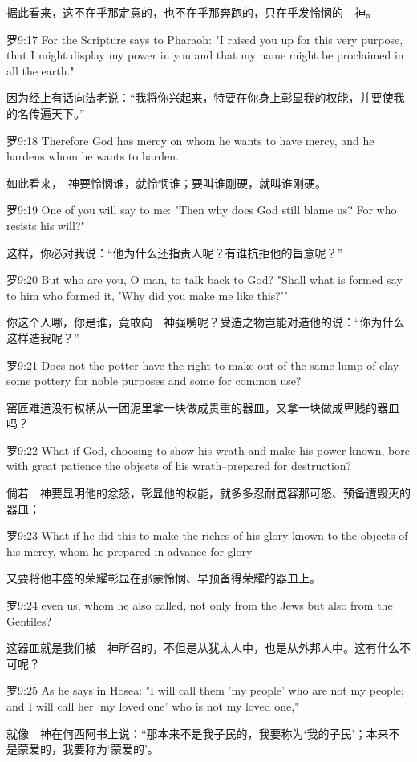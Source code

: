 \documentclass[a4paper,11pt,onecolumn,twoside]{ctexart}
\begin{document}
\begin{multicols}{2}
 据此看来，这不在乎那定意的，也不在乎那奔跑的，只在乎发怜悯的　神。


 罗9:17
 For the Scripture says to Pharaoh: "I raised you up for this very purpose, that I might display my power in you and that my name might be proclaimed in all the earth."

 因为经上有话向法老说：“我将你兴起来，特要在你身上彰显我的权能，并要使我的名传遍天下。”


 罗9:18
 Therefore God has mercy on whom he wants to have mercy, and he hardens whom he wants to harden.

 如此看来，　神要怜悯谁，就怜悯谁；要叫谁刚硬，就叫谁刚硬。


 罗9:19
 One of you will say to me: "Then why does God still blame us? For who resists his will?"

 这样，你必对我说：“他为什么还指责人呢？有谁抗拒他的旨意呢？”


 罗9:20
 But who are you, O man, to talk back to God? "Shall what is formed say to him who formed it, 'Why did you make me like this?'"

 你这个人哪，你是谁，竟敢向　神强嘴呢？受造之物岂能对造他的说：“你为什么这样造我呢？”


 罗9:21
 Does not the potter have the right to make out of the same lump of clay some pottery for noble purposes and some for common use?

 窑匠难道没有权柄从一团泥里拿一块做成贵重的器皿，又拿一块做成卑贱的器皿吗？


 罗9:22
 What if God, choosing to show his wrath and make his power known, bore with great patience the objects of his wrath--prepared for destruction?

 倘若　神要显明他的忿怒，彰显他的权能，就多多忍耐宽容那可怒、预备遭毁灭的器皿；


 罗9:23
 What if he did this to make the riches of his glory known to the objects of his mercy, whom he prepared in advance for glory--

 又要将他丰盛的荣耀彰显在那蒙怜悯、早预备得荣耀的器皿上。


 罗9:24
 even us, whom he also called, not only from the Jews but also from the Gentiles?

 这器皿就是我们被　神所召的，不但是从犹太人中，也是从外邦人中。这有什么不可呢？


 罗9:25
 As he says in Hosea: "I will call them 'my people' who are not my people; and I will call her 'my loved one' who is not my loved one,"

 就像　神在何西阿书上说：“那本来不是我子民的，我要称为‘我的子民’；本来不是蒙爱的，我要称为‘蒙爱的’。



\end{multicols}
\end{document}
